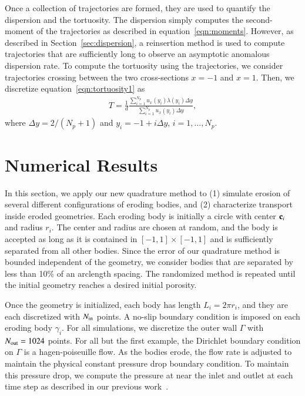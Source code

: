 \documentclass[preprint, 10pt]{elsarticle}
\begin{document}
Once a collection of trajectories are formed, they are used to quantify
the dispersion and the tortuosity.  The dispersion simply computes the
second-moment of the trajectories as described in
equation~\eqref{eqn:moments}.  However, as described in
Section~\ref{sec:dispersion}, a reinsertion method is used to compute
trajectories that are sufficiently long to observe an asymptotic
anomalous dispersion rate.  To compute the tortuosity using the
trajectories, we consider trajectories crossing between the two
cross-sections $x=-1$ and $x=1$.  Then, we discretize
equation~\eqref{eqn:tortuosity1} as
\begin{align}
  T = \frac{1}{d}\frac{\displaystyle\sum_{i=1}^{N_p} 
    u_x(y_i) \lambda(y_i) \Delta y}
  {\displaystyle\sum_{i=1}^{N_p} u_x(y_i) \Delta y}, 
\end{align}
where $\Delta y = 2/(N_p + 1)$ and $y_i = -1 + i \Delta y$,
$i=1,\ldots,N_p$.  

\section{Numerical Results}
\label{sec:results}
In this section, we apply our new quadrature method to (1) simulate
erosion of several different configurations of eroding bodies, and (2)
characterize transport inside eroded geometries.  Each eroding body is
initially a circle with center ${\mathbf{c}}_i$ and radius $r_i$.  The center and
radius are chosen at random, and the body is accepted as long as it is
contained in $[-1,1] \times [-1,1]$ and is sufficiently separated from
all other bodies.  Since the error of our quadrature method is bounded
independent of the geometry, we consider bodies that are separated by
less than 10\% of an arclength spacing.  The randomized method is
repeated until the initial geometry reaches a desired initial porosity.

Once the geometry is initialized, each body has length $L_i = 2\pi r_i$,
and they are each discretized with $N_{\mathrm{in}}$ points.  A no-slip boundary
condition is imposed on each eroding body $\gamma_i$.  For all
simulations, we discretize the outer wall $\Gamma$ with $N_{\mathrm{out}}=1024$
points.  For all but the first example, the Dirichlet boundary condition
on $\Gamma$ is a hagen-poiseuille flow.  As the bodies erode, the flow
rate is adjusted to maintain the physical constant pressure drop
boundary condition.  To maintain this pressure drop, we compute the
pressure at near the inlet and outlet at each time step as described in
our previous work~\cite{qua-moo2018}.
\end{document}
